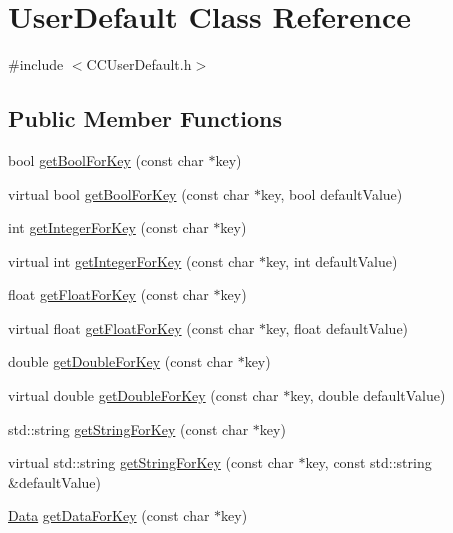 \hypertarget{classUserDefault}{}\section{User\+Default Class Reference}
\label{classUserDefault}


{\ttfamily \#include $<$C\+C\+User\+Default.\+h$>$}

\subsection*{Public Member Functions}
\begin{DoxyCompactItemize}
\item 
bool \hyperlink{classUserDefault_a81d252db31d6e11ae2e1ded0e0bdce5c}{get\+Bool\+For\+Key} (const char $\ast$key)
\item 
virtual bool \hyperlink{classUserDefault_ae46d53343463c64e3b6f1d98a3e859e1}{get\+Bool\+For\+Key} (const char $\ast$key, bool default\+Value)
\item 
int \hyperlink{classUserDefault_a76088fadfecbeaf693c002d5bdb8c622}{get\+Integer\+For\+Key} (const char $\ast$key)
\item 
virtual int \hyperlink{classUserDefault_ad40bc03484f1aedd248f0e25d5de7822}{get\+Integer\+For\+Key} (const char $\ast$key, int default\+Value)
\item 
float \hyperlink{classUserDefault_a04582157f27ec75bbc9a8abaf9c709a9}{get\+Float\+For\+Key} (const char $\ast$key)
\item 
virtual float \hyperlink{classUserDefault_afa9d19fccb8eadd64500c62362c02bb1}{get\+Float\+For\+Key} (const char $\ast$key, float default\+Value)
\item 
double \hyperlink{classUserDefault_a5cde9f96889493950057fb4b6ec34464}{get\+Double\+For\+Key} (const char $\ast$key)
\item 
virtual double \hyperlink{classUserDefault_aa3427410ff27ebd6071c1078bfce5252}{get\+Double\+For\+Key} (const char $\ast$key, double default\+Value)
\item 
std\+::string \hyperlink{classUserDefault_afd5ed352bbd91dbe2c0c377ad31e8a59}{get\+String\+For\+Key} (const char $\ast$key)
\item 
virtual std\+::string \hyperlink{classUserDefault_a3fdbb8a3fb13b1b2354b8b69cdf79a67}{get\+String\+For\+Key} (const char $\ast$key, const std\+::string \&default\+Value)
\item 
\hyperlink{classData}{Data} \hyperlink{classUserDefault_aa01598193b5ee7c6db0b53e02297d44d}{get\+Data\+For\+Key} (const char $\ast$key)

\end{DoxyCompactItemize}
